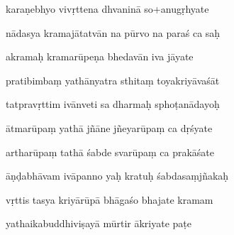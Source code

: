 \documentclass[article,12pt,a4paper]{memoir}%
\newcounter{parCount}
\begin{document}
	  
	  \pstart \leavevmode%
	karaṇebhyo vivṛttena dhvaninā so+anugṛhyate 
	{}
	\pend%
      

	  
	  \pstart {} nādasya kramajātatvān na pūrvo na paraś ca saḥ 
	{}
	\pend%
      

	  
	  \pstart \leavevmode%
	akramaḥ kramarūpeṇa bhedavān iva jāyate 
	{}
	\pend%
      

	  
	  \pstart {} pratibimbaṃ yathānyatra sthitaṃ toyakriyāvaśāt 
	{}
	\pend%
      

	  
	  \pstart \leavevmode%
	tatpravṛttim ivānveti sa dharmaḥ sphoṭanādayoḥ 
	{}
	\pend%
      

	  
	  \pstart {} ātmarūpaṃ yathā jñāne jñeyarūpaṃ ca dṛśyate 
	{}
	\pend%
      

	  
	  \pstart \leavevmode%
	artharūpaṃ tathā śabde svarūpaṃ ca prakāśate 
	{}
	\pend%
      

	  
	  \pstart {} āṇḍabhāvam ivāpanno yaḥ kratuḥ śabdasaṃjñakaḥ 
	{}
	\pend%
      

	  
	  \pstart \leavevmode%
	vṛttis tasya kriyārūpā bhāgaśo bhajate kramam 
	{}
	\pend%
      

	  
	  \pstart {} yathaikabuddhiviṣayā mūrtir ākriyate paṭe 
	{}
	\pend%
      
\end{document}
